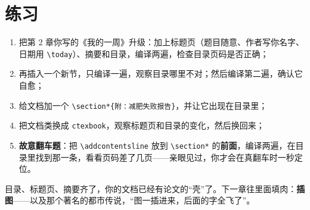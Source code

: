 \section*{练习}

\begin{enumerate}
\setlength{\itemsep}{2pt}
\item 把第 2 章你写的《我的一周》升级：加上标题页（题目随意、作者写你名字、日期用 \texttt{\textbackslash{}today}）、摘要和目录，编译两遍，检查目录页码是否正确；
\item 再插入一个新节，只编译一遍，观察目录哪里不对；然后编译第二遍，确认它自愈；
\item 给文档加一个 \texttt{\textbackslash{}section*\{附：减肥失败报告\}}，并让它出现在目录里；
\item 把文档类换成 \texttt{ctexbook}，观察标题页和目录的变化，然后换回来；
\item \textbf{故意翻车题}：把 \texttt{\textbackslash{}addcontentsline} 放到 \texttt{\textbackslash{}section*} 的\textbf{前面}，编译两遍，在目录里找到那一条，看看页码差了几页——亲眼见过，你才会在真翻车时一秒定位。
\end{enumerate}

目录、标题页、摘要齐了，你的文档已经有论文的“壳”了。下一章往里面填肉：\textbf{插图}——以及那个著名的都市传说，“图一插进来，后面的字全飞了”。
